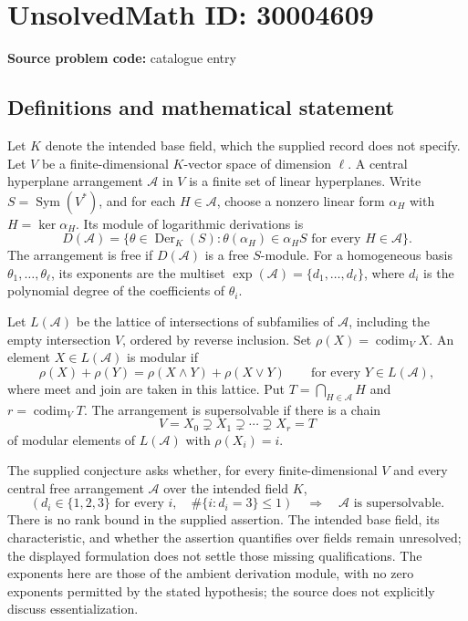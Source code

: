 \documentclass[11pt]{article}
\begin{document}
\section*{UnsolvedMath ID: 30004609}
\textbf{Source problem code:} catalogue entry
\subsection{Definitions and mathematical statement}
Let \(K\) denote the intended base field, which the supplied record does not specify. Let \(V\) be a finite-dimensional \(K\)-vector space of dimension \(\ell\). A central hyperplane arrangement \(\mathcal A\) in \(V\) is a finite set of linear hyperplanes. Write \(S=\operatorname{Sym}(V^*)\), and for each \(H\in\mathcal A\), choose a nonzero linear form \(\alpha_H\) with \(H=\ker\alpha_H\). Its module of logarithmic derivations is
\[
D(\mathcal A)=\{\theta\in\operatorname{Der}_K(S):\theta(\alpha_H)\in\alpha_H S\text{ for every }H\in\mathcal A\}.
\]
The arrangement is free if \(D(\mathcal A)\) is a free \(S\)-module. For a homogeneous basis \(\theta_1,\ldots,\theta_\ell\), its exponents are the multiset \(\exp(\mathcal A)=\{d_1,\ldots,d_\ell\}\), where \(d_i\) is the polynomial degree of the coefficients of \(\theta_i\).

Let \(L(\mathcal A)\) be the lattice of intersections of subfamilies of \(\mathcal A\), including the empty intersection \(V\), ordered by reverse inclusion. Set \(\rho(X)=\operatorname{codim}_V X\). An element \(X\in L(\mathcal A)\) is modular if
\[
\rho(X)+\rho(Y)=\rho(X\wedge Y)+\rho(X\vee Y)
\qquad\text{for every }Y\in L(\mathcal A),
\]
where meet and join are taken in this lattice. Put \(T=\bigcap_{H\in\mathcal A}H\) and \(r=\operatorname{codim}_V T\). The arrangement is supersolvable if there is a chain
\[
V=X_0\supsetneq X_1\supsetneq\cdots\supsetneq X_r=T
\]
of modular elements of \(L(\mathcal A)\) with \(\rho(X_i)=i\).

The supplied conjecture asks whether, for every finite-dimensional \(V\) and every central free arrangement \(\mathcal A\) over the intended field \(K\),
\[
\left(d_i\in\{1,2,3\}\text{ for every }i,\quad
\#\{i:d_i=3\}\leq 1\right)
\quad\Longrightarrow\quad
\mathcal A\text{ is supersolvable}.
\]
There is no rank bound in the supplied assertion. The intended base field, its characteristic, and whether the assertion quantifies over fields remain unresolved; the displayed formulation does not settle those missing qualifications. The exponents here are those of the ambient derivation module, with no zero exponents permitted by the stated hypothesis; the source does not explicitly discuss essentialization.
\end{document}
